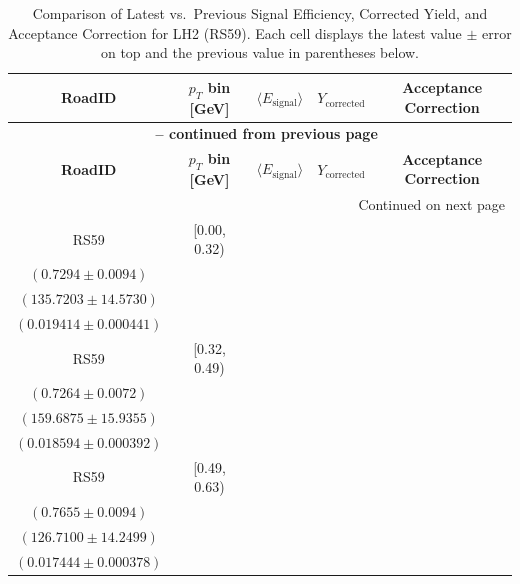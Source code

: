 {\footnotesize
\renewcommand{\arraystretch}{1.35}
\begin{longtable}{|c|c|c|c|c|}
\caption{Comparison of Latest vs.\ Previous Signal Efficiency, Corrected Yield, and Acceptance Correction for LH2 (RS59). Each cell displays the latest value $\pm$ error on top and the previous value in parentheses below.} \label{tab:eff_acc_comp_LH2_RS59} \\
\hline
\textbf{RoadID} & \textbf{$p_{T}$ bin [GeV]} & \textbf{$\langle E_{\mathrm{signal}} \rangle$} & \textbf{$Y_{\mathrm{corrected}}$} & \textbf{Acceptance Correction} \\
\hline
\endfirsthead
\multicolumn{5}{c}{{\bfseries \tablename\ \thetable{} -- continued from previous page}} \\
\hline
\textbf{RoadID} & \textbf{$p_{T}$ bin [GeV]} & \textbf{$\langle E_{\mathrm{signal}} \rangle$} & \textbf{$Y_{\mathrm{corrected}}$} & \textbf{Acceptance Correction} \\
\hline
\endhead
\hline \multicolumn{5}{|r|}{{Continued on next page}} \\ \hline
\endfoot
\hline
\endlastfoot
RS59 & [0.00, 0.32) & \begin{tabular}{@{}c@{}}$0.7447 \pm 0.0083$ \\ $(0.7294 \pm 0.0094)$\end{tabular} & \begin{tabular}{@{}c@{}}$132.9470 \pm 14.2752$ \\ $(135.7203 \pm 14.5730)$\end{tabular} & \begin{tabular}{@{}c@{}}$0.016768 \pm 0.000765$ \\ $(0.019414 \pm 0.000441)$\end{tabular} \\ \hline
RS59 & [0.32, 0.49) & \begin{tabular}{@{}c@{}}$0.7072 \pm 0.0086$ \\ $(0.7264 \pm 0.0072)$\end{tabular} & \begin{tabular}{@{}c@{}}$164.0360 \pm 16.3694$ \\ $(159.6875 \pm 15.9355)$\end{tabular} & \begin{tabular}{@{}c@{}}$0.016532 \pm 0.000693$ \\ $(0.018594 \pm 0.000392)$\end{tabular} \\ \hline
RS59 & [0.49, 0.63) & \begin{tabular}{@{}c@{}}$0.7568 \pm 0.0085$ \\ $(0.7655 \pm 0.0094)$\end{tabular} & \begin{tabular}{@{}c@{}}$128.1719 \pm 14.4143$ \\ $(126.7100 \pm 14.2499)$\end{tabular} & \begin{tabular}{@{}c@{}}$0.015708 \pm 0.000672$ \\ $(0.017444 \pm 0.000378)$\end{tabular} \\ \hline

\end{longtable}}
